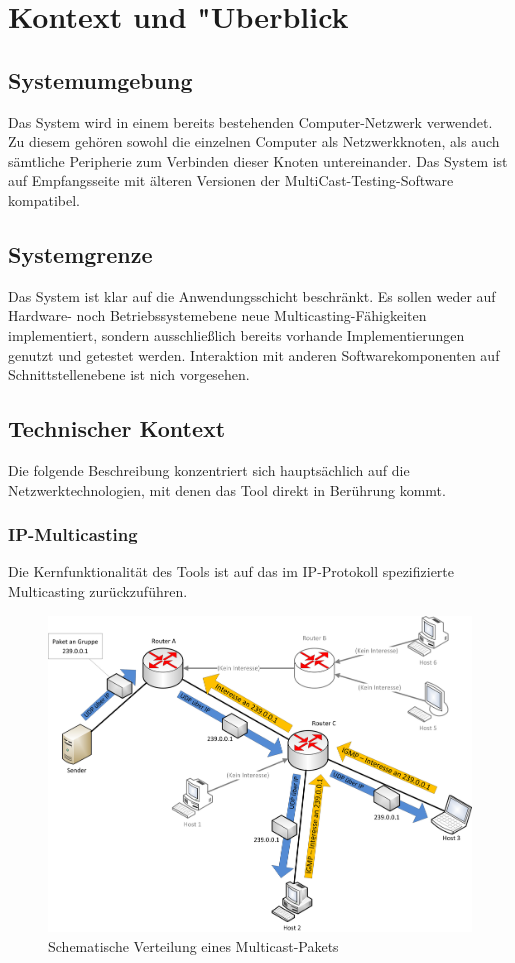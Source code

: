 \chapter{Kontext und "Uberblick}
\label{cha:kont}

\section{Systemumgebung}
Das System wird in einem bereits bestehenden Computer-Netzwerk verwendet. Zu
diesem gehören sowohl die einzelnen Computer als Netzwerkknoten, als auch
sämtliche Peripherie zum Verbinden dieser Knoten untereinander. Das System
ist auf Empfangsseite mit älteren Versionen
der MultiCast-Testing-Software kompatibel.

\section{Systemgrenze}
Das System ist klar auf die Anwendungsschicht beschränkt. Es sollen weder auf
Hardware- noch Betriebssystemebene neue Multicasting-Fähigkeiten implementiert, sondern ausschließlich bereits vorhande Implementierungen genutzt und
getestet werden. Interaktion mit anderen Softwarekomponenten auf
Schnittstellenebene ist nich vorgesehen.

\section{Technischer Kontext}
Die folgende Beschreibung konzentriert sich hauptsächlich auf die 
Netzwerktechnologien, mit denen das Tool direkt in Berührung kommt.

\subsection{IP-Multicasting}
Die Kernfunktionalität des Tools ist auf das im IP-Protokoll spezifizierte
Multicasting zurückzuführen.

\begin{figure}
\includegraphics[width=15cm]{images/multicasting.png}
\centering
\caption{Schematische Verteilung eines Multicast-Pakets}
\label{mc_overview}
\end{figure}

